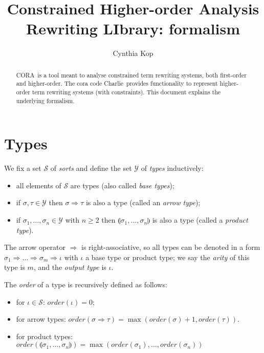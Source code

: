 \documentclass{lmcs}
\theoremstyle{theorem}\newtheorem{theorem}{Theorem}
\theoremstyle{theorem}\newtheorem{lemma}[theorem]{Lemma}
\theoremstyle{theorem}\newtheorem{corollary}[theorem]{Corollary}
\theoremstyle{definition}\newtheorem{definition}[theorem]{Definition}
\theoremstyle{definition}\newtheorem{example}[theorem]{Example}
\newcommand{\Sorts}{\mathcal{S}}
\newcommand{\Types}{\mathcal{Y}}
\newcommand{\order}{\mathit{order}}
\newcommand{\asort}{\iota}
\newcommand{\atype}{\sigma}
\newcommand{\btype}{\tau}
\newcommand{\product}[2]{\llparenthesis #1,\dots,#2 \rrparenthesis}
\newcommand{\arrtype}{\Rightarrow}
\newcommand{\cora}{\textsf{CORA}\xspace}
\newcommand{\charlie}{\textsf{Charlie}\xspace}
\begin{document}
\title{Constrained Higher-order Analysis Rewriting LIbrary: formalism}
\author{Cynthia Kop}
\address{Department of Software Science, Radboud University Nijmegen}

\maketitle

\begin{abstract}
\cora\ is a tool meant to analyse constrained term rewriting systems, both
first-order and higher-order.
The cora code \charlie\ provides functionality to represent higher-order term
rewriting systems (with constraints).
This document explains the underlying formalism.
\end{abstract}

\section{Types}

We fix a set $\Sorts$ of \emph{sorts} and define the set $\Types$ of
\emph{types} inductively:
\begin{itemize}
\item all elements of $\Sorts$ are types (also called \emph{base types});
\item if $\atype,\btype \in \Types$ then $\atype \arrtype \btype$ is also a type
  (called an \emph{arrow type});
\item if $\atype_1,\dots,\atype_n \in \Types$ with $n \geq 2$ then
  $\product{\atype_1}{\atype_n}$ is also a type (called a \emph{product type}).
\end{itemize}
The arrow operator $\arrtype$ is right-associative, so all types can be denoted
in a form $\atype_1 \arrtype \dots \arrtype \atype_m \arrtype \asort$ with
$\asort$ a base type or product type; we say the \emph{arity} of this type is
$m$, and the \emph{output type} is $\asort$.

The \emph{order} of a type is recursively defined as follows:
\begin{itemize}
\item for $\asort \in \Sorts$: $\order(\asort) = 0$;
\item for arrow types: $\order(\atype \arrtype \btype) = \max(\order(\atype) +
  1,\order(\btype))$.
\item for product types: $\order(\product{\atype_1}{\atype_n}) =
  \max(\order(\atype_1),\dots,\order(\atype_n))$
\end{itemize}
\end{document}

